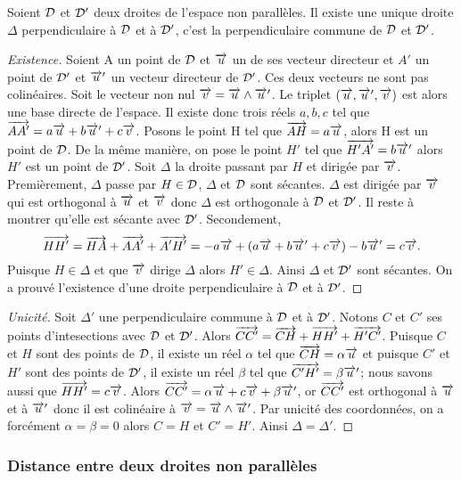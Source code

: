 \begin{theo}
  Soient $\mathcal{D}$ et $\mathcal{D}'$ deux droites de l'espace non parallèles. Il existe une unique droite $\Delta$ perpendiculaire à $\mathcal{D}$ et à $\mathcal{D}'$, c'est la perpendiculaire commune de $\mathcal{D}$ et $\mathcal{D}'$.
\end{theo}
\begin{proof}[Existence]
  Soient A un point de $\mathcal{D}$ et $\overrightarrow{u}$ un de ses vecteur directeur et $A'$ un point de $\mathcal{D}'$ et $\overrightarrow{u}'$ un vecteur directeur de $\mathcal{D}'$. Ces deux vecteurs ne sont pas colinéaires. Soit le vecteur non nul $\overrightarrow{v}=\overrightarrow{u}\wedge\overrightarrow{u}'$. Le triplet $(\overrightarrow{u},\overrightarrow{u}',\overrightarrow{v})$ est alors une base directe de l'espace. Il existe donc trois réels $a,b,c$ tel que $\overrightarrow{AA'}=a\overrightarrow{u}+b\overrightarrow{u}'+c\overrightarrow{v}$. Posons le point H tel que $\overrightarrow{AH}=a\overrightarrow{u}$, alors H est un point de $\mathcal{D}$. De la même manière, on pose le point $H'$ tel que $\overrightarrow{H'A'}=b\overrightarrow{u}'$ alors $H'$ est un point de $\mathcal{D}'$. Soit $\Delta$ la droite passant par $H$ et dirigée par $\overrightarrow{v}$. Premièrement, $\Delta$ passe par $H\in\mathcal{D}$, $\Delta$ et $\mathcal{D}$ sont sécantes. $\Delta$ est dirigée par $\overrightarrow{v}$ qui est orthogonal à $\overrightarrow{u}$ et $\overrightarrow{v}$ donc $\Delta$ est orthogonale à $\mathcal{D}$ et $\mathcal{D}'$. Il reste à montrer qu'elle est sécante avec $\mathcal{D}'$. Secondement,
\begin{equation}
  \overrightarrow{HH'}=\overrightarrow{HA}+\overrightarrow{AA'}+\overrightarrow{A'H'}=-a\overrightarrow{u}+(a\overrightarrow{u}+b\overrightarrow{u}'+c\overrightarrow{v})-b\overrightarrow{u}'=c\overrightarrow{v}.
\end{equation}
Puisque $H\in\Delta$ et que $\overrightarrow{v}$ dirige $\Delta$ alors $H'\in\Delta$. Ainsi $\Delta$ et $\mathcal{D}'$ sont sécantes. On a prouvé l'existence d'une droite perpendiculaire à $\mathcal{D}$ et à $\mathcal{D}'$.
\end{proof}
\begin{proof}[Unicité]
  Soit $\Delta'$ une perpendiculaire commune à $\mathcal{D}$ et à $\mathcal{D}'$. Notons $C$ et $C'$ ses points d'intesections avec $\mathcal{D}$ et $\mathcal{D}'$. Alors $\overrightarrow{CC'}=\overrightarrow{CH}+\overrightarrow{HH'}+\overrightarrow{H'C'}$. Puisque $C$ et $H$ sont des points de $\mathcal{D}$, il existe un réel $\alpha$ tel que $\overrightarrow{CH}=\alpha\overrightarrow{u}$ et puisque $C'$ et $H'$ sont des points de $\mathcal{D}'$, il existe un réel $\beta$ tel que $\overrightarrow{C'H'}=\beta\overrightarrow{u}'$; nous savons aussi que $\overrightarrow{HH'}=c\overrightarrow{v}$. Alors $\overrightarrow{CC'}=\alpha\overrightarrow{u}+c\overrightarrow{v}+\beta\overrightarrow{u}'$, or $\overrightarrow{CC'}$ est orthogonal à $\overrightarrow{u}$ et à $\overrightarrow{u}'$ donc il est colinéaire à $\overrightarrow{v}=\overrightarrow{u}\wedge\overrightarrow{u}'$. Par unicité des coordonnées, on a forcément $\alpha=\beta=0$ alors $C=H$ et $C'=H'$. Ainsi $\Delta=\Delta'$.
\end{proof}

\subsubsection{Distance entre deux droites non parallèles}

